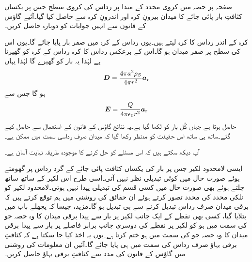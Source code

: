 صفحہ  پر حصہ  میں کروی محدد کے مبدا پر   رداس کی کروی سطح جس پر یکساں  کثافتِ بار پائی جائے کا میدان بیرونِ کرہ اور اندرونِ کرہ  سے حاصل کیا گیا۔آئیے گاؤس کے قانون سے انہیں جوابات کو دوبارہ حاصل کریں۔

کرہ کے اندر  رداس کا کرہ لیتے ہیں۔یوں  رداس کے کرہ میں صفر بار پایا جائے گا۔یوں اس کی سطح پر صفر میدان ہو گا۔اس کے برعکس  رداس کا کرہ  رداس کے کرہ کو گھیرتا ہے لہٰذا یہ  بار کو گھیرے گا لہٰذا یہاں
\begin{align*}
{\ensuremath{{\boldsymbol{D}}}}=\frac{4\pi a^2\rho_S}{4\pi r^2 }{\boldsymbol{a}}_{\textup{r}}
\end{align*}
ہو گا جس سے
\begin{align*}
{\ensuremath{{\boldsymbol{E}}}}=\frac{Q}{4\pi \epsilon_0 r^2 }{\boldsymbol{a}}_{\textup{r}}
\end{align*}
حاصل ہوتا ہے جہاں کُل بار کو  لکھا گیا ہے۔یہ نتائج گاؤس کے قانون کے استعمال سے حاصل کیے گئے۔ساتھ ہی ساتھ اس حقیقت کو مدنظر رکھا گیا کہ میدان صرف رداسی سمت میں ممکن ہے۔

آپ دیکھ سکتے ہیں کہ اس مسئلے کو حل کرنے کا موجودہ طریقہ نہایت آسان ہے۔

ایسی لامحدود لکیر جس پر بار کی یکساں کثافت پائی جائے کے گرد رداس پر گھومتے ہوئے  صورت حال میں کوئی تبدیلی نظر نہیں آتی۔اسی طرح اس لکیر کے ساتھ ساتھ چلتے ہوئے بھی صورت حال میں کسی قسم کی تبدیلی پیدا نہیں ہوتی۔لامحدود لکیر کو نلکی محدد کی  محدد تصور کرتے  ہوئے  ان حقائق کی روشنی میں ہم توقع کرتے ہیں کہ برقی میدان صرف  رداس تبدیل کرنے سے ہی تبدیل ہو گا۔مزید، جیسا کہ پچھلے باب میں بتلایا گیا، کسی بھی نقطے کے ایک جانب لکیر پر بار سے پیدا برقی میدان کا وہ حصہ جو  کی سمت میں ہو کو لکیر پر نقطے کی دوسری جانب برابر فاصلے  پر بار سے پیدا برقی میدان کا وہ حصہ جو  کی سمت میں ہو  ختم کرتا ہے۔یوں یہ اخذ کیا جا سکتا ہے کہ کثافتِ برقی بہاؤ صرف رداس کی سمت میں ہی پایا جائے گا۔آئیں ان معلومات کی روشنی میں گاؤس کے قانون کی مدد سے کثافتِ برقی بہاؤ حاصل کریں۔

